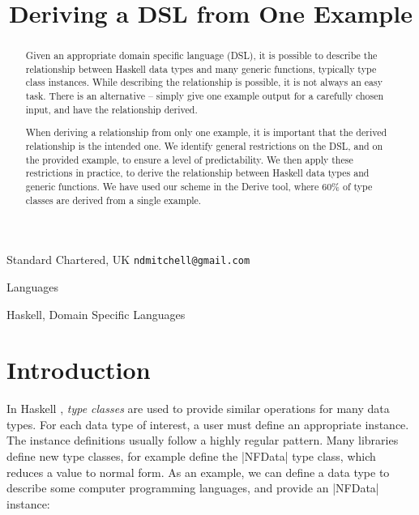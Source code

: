 \documentclass[preprint,draft]{sigplanconf}
\begin{document}
\copyrightdata{[to be supplied]}

\titlebanner{\today{} - \currenttime{}}        %
\preprintfooter{}   %

\title{Deriving a DSL from One Example}

           {Standard Chartered, UK}
           {\verb"ndmitchell@gmail.com"}

\maketitle

\begin{abstract}
Given an appropriate domain specific language (DSL), it is possible to describe the relationship between Haskell data types and many generic functions, typically type class instances. While describing the relationship is possible, it is not always an easy task. There is an alternative -- simply give one example output for a carefully chosen input, and have the relationship derived.

When deriving a relationship from only one example, it is important that the derived relationship is the intended one. We identify general restrictions on the DSL, and on the provided example, to ensure a level of predictability. We then apply these restrictions in practice, to derive the relationship between Haskell data types and generic functions. We have used our scheme in the Derive tool, where 60\% of type classes are derived from a single example.
\end{abstract}


\terms
Languages

\keywords
Haskell, Domain Specific Languages

\section{Introduction}
\label{sec:introduction}

In Haskell \cite{haskell}, \textit{type classes} \cite{wadler:type_classes} are used to provide similar operations for many data types. For each data type of interest, a user must define an appropriate instance. The instance definitions usually follow a highly regular pattern. Many libraries define new type classes, for example \citet{trinder:strategies} define the |NFData| type class, which reduces a value to normal form. As an example, we can define a data type to describe some computer programming languages, and provide an |NFData| instance:
\end{document}
